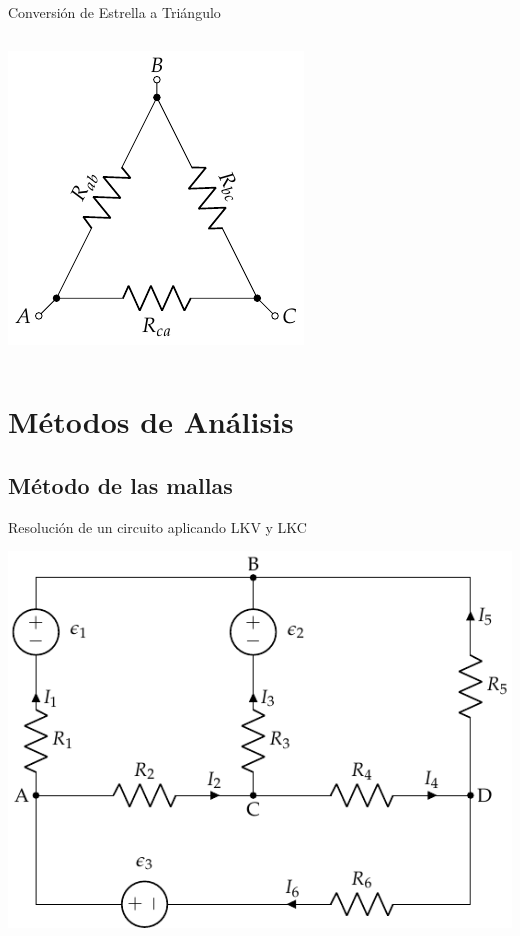 \documentclass[xcolor={usenames,svgnames,dvipsnames}]{beamer}
\begin{document}
\begin{frame}[label={sec:orgb5e6ed6}]{Conversión de Estrella a Triángulo}
\begin{columns}
\begin{column}{0.3\columnwidth}
\begin{center}
\includegraphics[width=.9\linewidth]{figs/Conexion_Triangulo.pdf}
\end{center}
\end{column}
\end{columns}
\end{frame}
\section{Métodos de Análisis}
\label{sec:org9a885c9}

\subsection{Método de las mallas}
\label{sec:orgcd21dd9}

\begin{frame}[label={sec:orgc6a8ac9}]{Resolución de un circuito aplicando LKV y LKC}
\begin{center}
\includegraphics[width=.9\linewidth]{figs/mallas1.pdf}
\end{center}
\end{frame}
\end{document}
